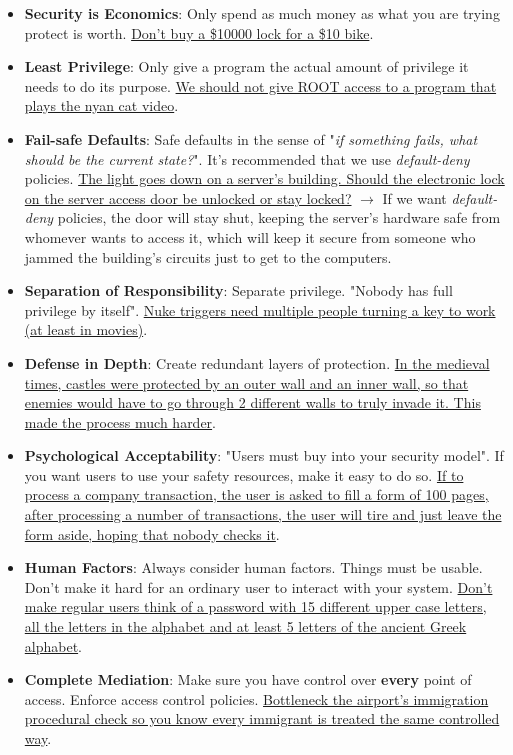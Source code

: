 \documentclass[11pt]{article}
\begin{document}
\begin{itemize}
\item \textbf{Security is Economics}: Only spend as much money as what you are trying protect is worth. \uline{Don't buy a \$10000 lock for a \$10 bike}.
\item \textbf{Least Privilege}: Only give a program the actual amount of privilege it needs to do its purpose. \uline{We should not give ROOT access to a program that plays the nyan cat video}.
\item \textbf{Fail-safe Defaults}: Safe defaults in the sense of "\emph{if something fails, what should be the current state?}". It's recommended that we use \emph{default-deny} policies. \uline{The light goes down on a server's building. Should the electronic lock on the server access door be unlocked or stay locked?} \(\to\) If we want \emph{default-deny} policies, the door will stay shut, keeping the server's hardware safe from whomever wants to access it, which will keep it secure from someone who jammed the building's circuits just to get to the computers.
\item \textbf{Separation of Responsibility}: Separate privilege. "Nobody has full privilege by itself". \uline{Nuke triggers need multiple people turning a key to work (at least in movies)}.
\item \textbf{Defense in Depth}: Create redundant layers of protection. \uline{In the medieval times, castles were protected by an outer wall and an inner wall, so that enemies would have to go through 2 different walls to truly invade it. This made the process much harder}.
\item \textbf{Psychological Acceptability}: "Users must buy into your security model". If you want users to use your safety resources, make it easy to do so. \uline{If to process a company transaction, the user is asked to fill a form of 100 pages, after processing a number of transactions, the user will tire and just leave the form aside, hoping that nobody checks it}.
\item \textbf{Human Factors}: Always consider human factors. Things must be usable. Don't make it hard for an ordinary user to interact with your system. \uline{Don't make regular users think of a password with 15 different upper case letters, all the letters in the alphabet and at least 5 letters of the ancient Greek alphabet}.
\item \textbf{Complete Mediation}: Make sure you have control over \textbf{every} point of access. Enforce access control policies. \uline{Bottleneck the airport's immigration procedural check so you know every immigrant is treated the same controlled way}.

\end{itemize}
\end{document}
